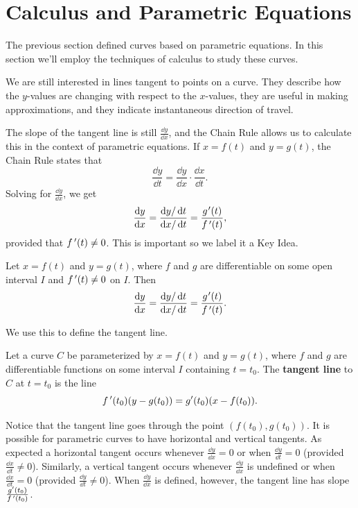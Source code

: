 \section{Calculus and Parametric Equations}\label{sec:par_calc}

The previous section defined curves based on parametric equations. In this section we'll employ the techniques of calculus to study these curves.

We are still interested in lines tangent to points on a curve. They describe how the $y$-values are changing with respect to the $x$-values, they are useful in making approximations, and they indicate instantaneous direction of travel.

The slope of the tangent line is still $\frac{\dd y}{\dd x}$, and the Chain Rule allows us to calculate this in the context of parametric equations. If $x=f(t)$ and $y=g(t)$, the Chain Rule states that
\[\frac{\dd y}{\dd t} = \frac{\dd y}{\dd x}\cdot\frac{\dd x}{\dd t}.\]
Solving for $\frac{\dd y}{\dd x}$, we get 
\[\frac{\dd y}{\dd x} = \frac{\dd y/\dd t}{\dd x/\dd t} = \frac{g\primeskip'(t)}{\fp(t)},\]
provided that $f\,'(t)\neq 0$. This is important so we label it a Key Idea.

\begin{keyidea}\label{idea:dydxpar}%
Let $x=f(t)$ and $y=g(t)$, where $f$ and $g$ are differentiable on some open interval $I$ and $f\,'(t)\neq 0$ on $I$. Then 
\[
\frac{\dd y}{\dd x}=\frac{\dd y/\dd t}{\dd x/\dd t}=\frac{g\primeskip'(t)}{\fp(t)}.
\]
\end{keyidea}

We use this to define the tangent line.

\begin{definition}\label{def:tangent_par}%
Let a curve $C$ be parameterized by $x=f(t)$ and $y=g(t)$, where $f$ and $g$ are differentiable functions on some interval $I$ containing $t=t_0$. The 
\textbf{tangent line} to $C$ at $t=t_0$ is the line
\[f\,'(t_0)(y-g(t_0))=g'(t_0)(x-f(t_0)).\]
\end{definition}

Notice that the tangent line goes through the point $(f(t_0),g(t_0))$.  It is possible for parametric curves to have horizontal and vertical tangents. As expected a horizontal tangent occurs whenever $\frac{\dd y}{\dd x} = 0$ or when $\frac{\dd y}{\dd t} = 0$ (provided $\frac{\dd x}{\dd t} \neq 0$). Similarly, a vertical tangent occurs whenever $\frac{\dd y}{\dd x}$ is undefined or when $\frac{\dd x}{\dd t} = 0$ (provided $\frac{\dd y}{\dd t} \neq 0$).  When $\frac{\dd y}{\dd x}$ is defined, however, the tangent line has slope $\frac{g'(t_0)}{f\,'(t_0)}$.

